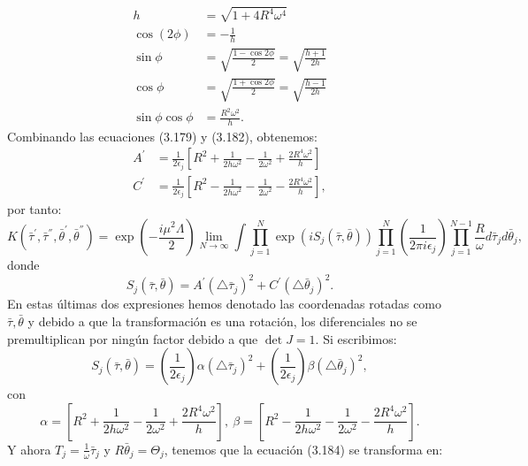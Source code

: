 \begin{align}
\nonumber h&=\sqrt{1+4R^4\omega^4}\\
\nonumber \cos(2\phi)&=-\frac{1}{h}\\
\nonumber \sin\phi&=\sqrt{\frac{1-\cos2\phi}{2}}=\sqrt{\frac{h+1}{2h}}\\
\nonumber \cos\phi&=\sqrt{\frac{1+\cos2\phi}{2}}=\sqrt{\frac{h-1}{2h}}\\
\sin\phi\cos\phi&=\frac{R^{2}\omega^{2}}{h}.
\end{align}
Combinando las ecuaciones (3.179) y (3.182), obtenemos:
\begin{align}
\nonumber A^{'}&=\frac{1}{2\epsilon_{j}}\left[R^{2}+\frac{1}{2h\omega^{2}}-\frac{1}{2\omega^{2}}+\frac{2R^{4}\omega^{2}}{h}\right]\\
C^{'}&=\frac{1}{2\epsilon_{j}}\left[R^{2}-\frac{1}{2h\omega^{2}}-\frac{1}{2\omega^{2}}-\frac{2R^{4}\omega^{2}}{h}\right],
\end{align}
por tanto:
\begin{equation}
K(\bar{\tau}^{'},\bar{\tau}^{''},\bar{\theta}^{'},\bar{\theta}^{''})=\exp\left(-\frac{i\mu^{2}\Lambda}{2}\right)\lim_{N\to\infty}\int\prod_{j=1}^{N}\exp(iS_{j}(\bar{\tau},\bar{\theta}))\prod_{j=1}^{N}\left(\frac{1}{2\pi i\epsilon_{j}}\right)\prod_{j=1}^{N-1}\frac{R}{\omega}d\bar{\tau}_{j}d\bar{\theta}_{j},
\end{equation}
donde
\begin{equation}
S_{j}(\bar{\tau},\bar{\theta})=A^{'}(\triangle\bar{\tau}_{j})^{2}+C^{'}(\triangle\bar{\theta}_{j})^{2}.
\end{equation}
En estas últimas dos expresiones hemos denotado las coordenadas rotadas como $\bar{\tau},\bar{\theta}$ y debido a que la transformación es una rotación, los diferenciales no se premultiplican por ningún factor debido a que $\det J=1$. Si escribimos:
\begin{equation}
S_{j}(\bar{\tau},\bar{\theta})=\left(\frac{1}{2\epsilon_{j}}\right)\alpha(\triangle\bar{\tau}_{j})^{2}+\left(\frac{1}{2\epsilon_{j}}\right)\beta(\triangle\bar{\theta}_{j})^{2},
\end{equation}
con
\begin{equation}
\alpha=\left[R^{2}+\frac{1}{2h\omega^{2}}-\frac{1}{2\omega^{2}}+\frac{2R^{4}\omega^{2}}{h}\right],\ \beta=\left[R^{2}-\frac{1}{2h\omega^{2}}-\frac{1}{2\omega^{2}}-\frac{2R^{4}\omega^{2}}{h}\right].
\end{equation}
Y ahora $T_j=\frac{1}{\omega}\bar{\tau}_j$ y $R\bar{\theta}_j=\Theta_j$, tenemos que la ecuación (3.184) se transforma en:
